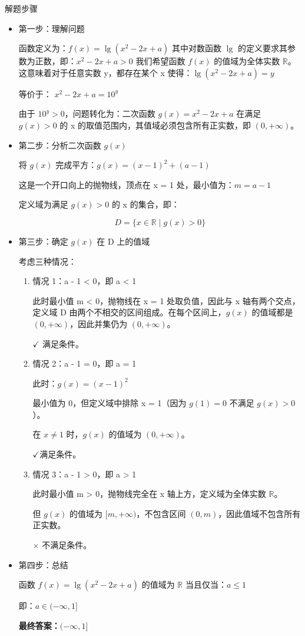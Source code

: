 \documentclass[CJKmath,a4paper,10pt]{ctexart}
\begin{document}
\begin{liti}
解题步骤
\begin{itemize}
\item   第一步：理解问题

函数定义为：$f(x) = \lg(x^2 - 2x + a)$ 其中对数函数 $\lg$ 的定义要求其参数为正数，即：$x^2 - 2x + a > 0$ 我们希望函数 \(f(x)\) 的值域为全体实数 $\mathbb{R}$。这意味着对于任意实数 y，都存在某个 x 使得：$\lg(x^2 - 2x + a) = y$

等价于：
$
x^2 - 2x + a = 10^y
$

由于 $10^y > 0$，问题转化为：二次函数
$g(x) = x^2 - 2x + a$
在满足 \(g(x) > 0\) 的 x 的取值范围内，其值域必须包含所有正实数，即 \((0, +\infty)\)。

\item  第二步：分析二次函数 \(g(x)\)

将 \(g(x)\) 完成平方：$g(x) = (x - 1)^2 + (a - 1)$

这是一个开口向上的抛物线，顶点在 x = 1 处，最小值为：$m = a - 1$

定义域为满足 \(g(x) > 0\) 的 x 的集合，即：

\[
D = \{ x \in \mathbb{R} \mid g(x) > 0 \}
\]

\item  第三步：确定 \(g(x)\) 在 D 上的值域

考虑三种情况：
\begin{enumerate}
\item  情况 1：a - 1 < 0，即 a < 1

此时最小值 m < 0，抛物线在 x = 1 处取负值，因此与 x 轴有两个交点，定义域 D 由两个不相交的区间组成。在每个区间上，\(g(x)\) 的值域都是 \((0, +\infty)\)，因此并集仍为 \((0, +\infty)\)。

$\checkmark$ 满足条件。

\item  情况 2：a - 1 = 0，即 a = 1

此时：$g(x) = (x - 1)^2$

最小值为 0，但定义域中排除 x = 1（因为 \(g(1) = 0\) 不满足 \(g(x) > 0\)）。

在 $x \ne 1$ 时，\(g(x)\) 的值域为 \((0, +\infty)\)。

$\checkmark$满足条件。

\item  情况 3：a - 1 > 0，即 a > 1

此时最小值 m > 0，抛物线完全在 x 轴上方，定义域为全体实数 $\mathbb{R}$。

但 \(g(x)\) 的值域为 \([m, +\infty)\)，不包含区间 \((0, m)\)，因此值域不包含所有正实数。

$\times$ 不满足条件。
\end{enumerate}
\item  第四步：总结

函数 \(f(x) = \lg(x^2 - 2x + a)\) 的值域为 $\mathbb{R}$ 当且仅当：$a \leq 1$

即：$a \in (-\infty, 1]$

\textbf{最终答案：}$\boxed{(-\infty,1]}$
\end{itemize}
\end{liti}
\end{document}
